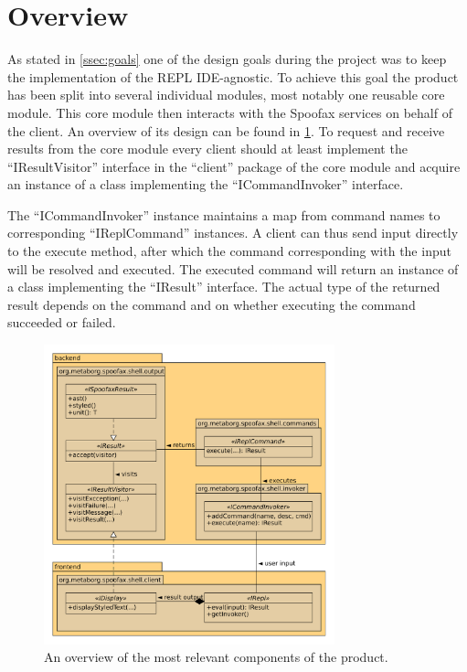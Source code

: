 \section{Overview}
\label{sec:overview}

As stated in \cref{ssec:goals} one of the design goals during the project was
to keep the implementation of the REPL IDE-agnostic. To achieve this goal the
product has been split into several individual modules, most notably one
reusable core module. This core module then interacts with the Spoofax services
on behalf of the client. An overview of its design can be found in
\cref{fig:uml-overview}. To request and receive results from the core module
every client should at least implement the ``IResultVisitor'' interface in the
``client'' package of the core module and acquire an instance of a class
implementing the ``ICommandInvoker'' interface.

The ``ICommandInvoker'' instance maintains a map from command names to
corresponding ``IReplCommand'' instances. A client can thus send input directly
to the execute method, after which the command corresponding with the input
will be resolved and executed. The executed command will return an instance of
a class implementing the ``IResult'' interface. The actual type of the returned
result depends on the command and on whether executing the command succeeded or
failed.

\begin{figure}[h!]
  \centering
  \includegraphics[width=0.75\textwidth]{uml-overview}
  \caption{An overview of the most relevant components of the product.}
  \label{fig:uml-overview}
\end{figure}
